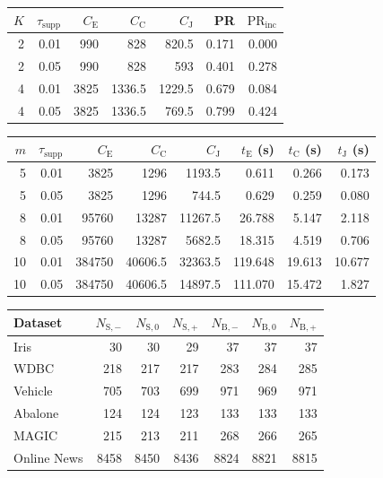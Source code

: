 \begin{table}
\label{tab:pruning}
\begin{tabular}{rrrrrrr}
\toprule
$K$ & $\tau_{\mathrm{supp}}$ & $C_{\mathrm{E}}$ & $C_{\mathrm{C}}$ & $C_{\mathrm{J}}$ & PR & {\color{red}$\mathrm{PR}_{\mathrm{inc}}$} \\
\midrule
2 & 0.01 & 990 & 828 & 820.5 & 0.171 & {\color{red}0.000} \\
2 & 0.05 & 990 & 828 & 593 & 0.401 & {\color{red}0.278} \\
4 & 0.01 & 3825 & 1336.5 & 1229.5 & 0.679 & {\color{red}0.084} \\
4 & 0.05 & 3825 & 1336.5 & 769.5 & 0.799 & {\color{red}0.424} \\
\bottomrule
\end{tabular}
\end{table}

\begin{table}
\label{tab:computational-extension}
\begin{tabular}{rrrrrrrr}
\toprule
$m$ & $\tau_{\mathrm{supp}}$ & $C_{\mathrm E}$ & $C_{\mathrm C}$ & $C_{\mathrm J}$ & $t_{\mathrm E}$ (s) & $t_{\mathrm C}$ (s) & $t_{\mathrm J}$ (s) \\
\midrule
5 & 0.01 & 3825 & 1296 & 1193.5 & 0.611 & 0.266 & 0.173 \\
5 & 0.05 & 3825 & 1296 & 744.5 & 0.629 & 0.259 & 0.080 \\
8 & 0.01 & 95760 & 13287 & 11267.5 & 26.788 & 5.147 & 2.118 \\
8 & 0.05 & 95760 & 13287 & 5682.5 & 18.315 & 4.519 & 0.706 \\
10 & 0.01 & 384750 & 40606.5 & 32363.5 & 119.648 & 19.613 & 10.677 \\
10 & 0.05 & 384750 & 40606.5 & 14897.5 & 111.070 & 15.472 & 1.827 \\
\bottomrule
\end{tabular}
\end{table}

\begin{table}
\label{tab:affine-matched}
\begin{tabular}{lrrrrrr}
\toprule
Dataset & $N_{\mathrm S,-}$ & $N_{\mathrm S,0}$ & $N_{\mathrm S,+}$ & $N_{\mathrm B,-}$ & $N_{\mathrm B,0}$ & $N_{\mathrm B,+}$ \\
\midrule
Iris & 30 & 30 & 29 & 37 & 37 & 37 \\
WDBC & 218 & 217 & 217 & 283 & 284 & 285 \\
Vehicle & 705 & 703 & 699 & 971 & 969 & 971 \\
Abalone & 124 & 124 & 123 & 133 & 133 & 133 \\
MAGIC & 215 & 213 & 211 & 268 & 266 & 265 \\
Online News & 8458 & 8450 & 8436 & 8824 & 8821 & 8815 \\
\bottomrule
\end{tabular}
\end{table}

